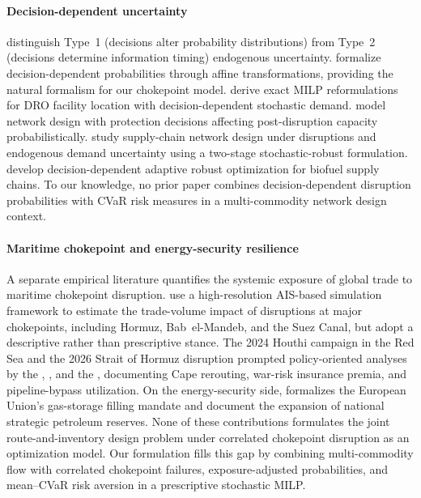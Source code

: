 \documentclass[final,3p,authoryear]{elsarticle}
\theoremstyle{definition}
\begin{document}
\paragraph{Decision-dependent uncertainty}
\cite{goel2006} distinguish Type~1 (decisions alter
probability distributions) from Type~2 (decisions determine information
timing) endogenous uncertainty. \cite{hellemo2018}
formalize decision-dependent probabilities through affine transformations,
providing the natural formalism for our chokepoint model. \cite{basciftci2021} derive exact MILP reformulations for DRO facility location
with decision-dependent stochastic demand. \cite{bhuiyan2020} model
network design with protection decisions affecting post-disruption capacity
probabilistically. \cite{luo2025two} study supply-chain network design under disruptions and endogenous demand uncertainty using a two-stage stochastic-robust formulation. \cite{zhao2019} develop decision-dependent
adaptive robust optimization for biofuel supply chains. To our knowledge,
no prior paper combines decision-dependent disruption probabilities with
CVaR risk measures in a multi-commodity network design context.

\paragraph{Maritime chokepoint and energy-security resilience}
A separate empirical literature quantifies the systemic exposure of
global trade to maritime chokepoint disruption.
\cite{verschuur2025} use a high-resolution AIS-based simulation
framework to estimate the trade-volume impact of disruptions at major
chokepoints, including Hormuz, Bab~el-Mandeb, and the Suez Canal, but
adopt a descriptive rather than prescriptive stance. The 2024 Houthi
campaign in the Red Sea and the 2026 Strait of Hormuz disruption
prompted policy-oriented analyses by the
\cite{iea2026hormuz}, \cite{cnbc2026pipelines}, and the
\cite{indiastrategic2026hormuz}, documenting Cape rerouting,
war-risk insurance premia, and pipeline-bypass utilization. On the
energy-security side, \cite{eu2022gasstorage} formalizes the European
Union's gas-storage filling mandate and \cite{eia2016spr} document the
expansion of national strategic petroleum reserves. None of these
contributions formulates the joint route-and-inventory design problem
under correlated chokepoint disruption as an optimization model. Our
formulation fills this gap by combining multi-commodity flow with
correlated chokepoint failures, exposure-adjusted probabilities, and
mean--CVaR risk aversion in a prescriptive stochastic MILP.
\end{document}
